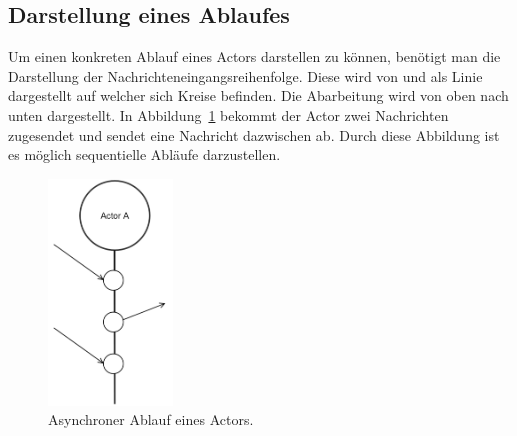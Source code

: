\subsection{Darstellung eines Ablaufes}
Um einen konkreten Ablauf eines Actors darstellen zu können, benötigt man die Darstellung der Nachrichteneingangsreihenfolge. Diese wird von \cite{kuhn2017reactive} und \cite{Vernon2015ReactiveAkka} als Linie dargestellt auf welcher sich Kreise befinden. Die Abarbeitung wird von oben nach unten dargestellt. In Abbildung~\ref{fig:actor:diagram:asynchronMessageReceivment} bekommt der Actor zwei Nachrichten zugesendet und sendet eine Nachricht dazwischen ab. Durch diese Abbildung ist es möglich sequentielle Abläufe darzustellen.
\begin{figure}
    \centering
    \includegraphics[height=6cm]{gfx/actor/actorAsynchMessgeFlow}
    \caption{Asynchroner Ablauf eines Actors.}
    \label{fig:actor:diagram:asynchronMessageReceivment}
\end{figure}